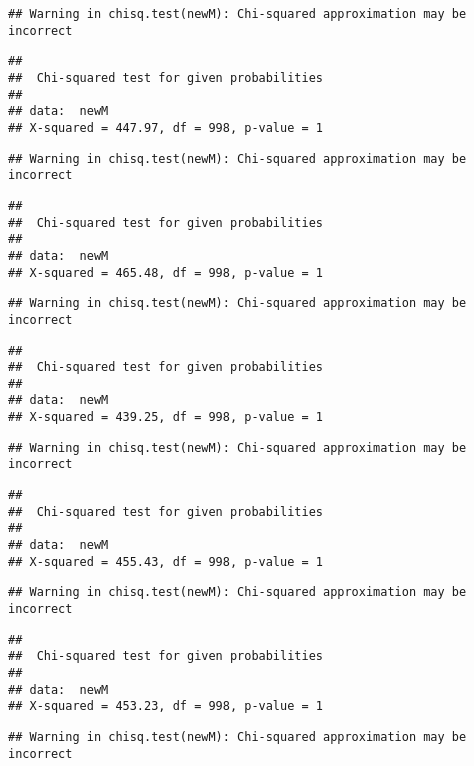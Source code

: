 \documentclass[]{article}
\begin{document}
\begin{verbatim}
## Warning in chisq.test(newM): Chi-squared approximation may be incorrect
\end{verbatim}

\begin{verbatim}
## 
##  Chi-squared test for given probabilities
## 
## data:  newM
## X-squared = 447.97, df = 998, p-value = 1
\end{verbatim}

\begin{verbatim}
## Warning in chisq.test(newM): Chi-squared approximation may be incorrect
\end{verbatim}

\begin{verbatim}
## 
##  Chi-squared test for given probabilities
## 
## data:  newM
## X-squared = 465.48, df = 998, p-value = 1
\end{verbatim}

\begin{verbatim}
## Warning in chisq.test(newM): Chi-squared approximation may be incorrect
\end{verbatim}

\begin{verbatim}
## 
##  Chi-squared test for given probabilities
## 
## data:  newM
## X-squared = 439.25, df = 998, p-value = 1
\end{verbatim}

\begin{verbatim}
## Warning in chisq.test(newM): Chi-squared approximation may be incorrect
\end{verbatim}

\begin{verbatim}
## 
##  Chi-squared test for given probabilities
## 
## data:  newM
## X-squared = 455.43, df = 998, p-value = 1
\end{verbatim}

\begin{verbatim}
## Warning in chisq.test(newM): Chi-squared approximation may be incorrect
\end{verbatim}

\begin{verbatim}
## 
##  Chi-squared test for given probabilities
## 
## data:  newM
## X-squared = 453.23, df = 998, p-value = 1
\end{verbatim}

\begin{verbatim}
## Warning in chisq.test(newM): Chi-squared approximation may be incorrect
\end{verbatim}
\end{document}
